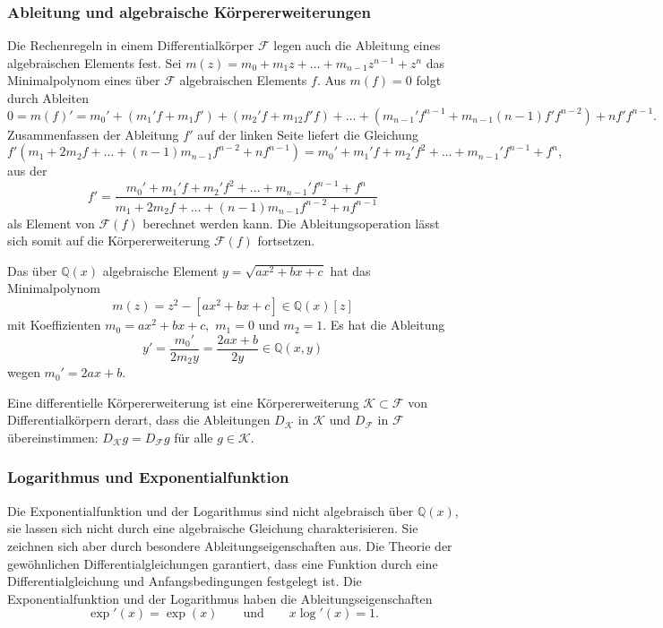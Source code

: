 \subsubsection{Ableitung und algebraische Körpererweiterungen}
Die Rechenregeln in einem Differentialkörper $\mathscr{F}$ legen auch die
Ableitung eines algebraischen Elements fest.
Sei $m(z)=m_0+m_1z+\ldots+m_{n-1}z^{n-1}+z^n$ das Minimalpolynom eines
über $\mathscr{F}$ algebraischen Elements $f$.
Aus $m(f)=0$ folgt durch Ableiten
\[
0
=
m(f)'
=
m_0'
+
(m_1'f+m_1f')
+
(m_2'f + m_12f'f)
+
\ldots
+
(m_{n-1}'f^{n-1} + m_{n-1} (n-1)f'f^{n-2})
+
nf'f^{n-1}.
\]
Zusammenfassen der Ableitung $f'$ auf der linken Seite liefert die
Gleichung
\[
f'(
m_1+2m_2f+\ldots+(n-1)m_{n-1}f^{n-2}+nf^{n-1}
)
=
m_0' + m_1'f + m_2'f^2 + \ldots + m_{n-1}'f^{n-1} + f^n,
\]
aus der
\[
f'
=
\frac{
m_0' + m_1'f + m_2'f^2 + \ldots + m_{n-1}'f^{n-1} + f^n
}{
m_1+2m_2f+\ldots+(n-1)m_{n-1}f^{n-2}+nf^{n-1}
}
\]
als Element von $\mathscr{F}(f)$ berechnet werden kann.
Die Ableitungsoperation lässt sich somit auf die Körpererweiterung
$\mathscr{F}(f)$ fortsetzen.

\begin{beispiel}
Das über $\mathbb{Q}(x)$ algebraische Element $y=\sqrt{ax^2+bx+c}$
hat das Minimalpolynom
\[
m(z)
=
z^2 - [ax^2+bx+c]
\in
\mathbb{Q}(x)[z]
\]
mit Koeffizienten $m_0 = ax^2+bx+c,$ $m_1=0$ und $m_2=1$.
Es hat die Ableitung
\[
y'
= 
\frac{m_0'}{2m_2y}
=
\frac{
2ax+b
}{
2y
}
\in
\mathbb{Q}(x,y)
\]
wegen $m_0'=2ax+b$.
\end{beispiel}

\begin{definition}
Eine differentielle Körpererweiterung ist eine Körpererweiterung
$\mathscr{K}\subset\mathscr{F}$ von Differentialkörpern derart, dass
die Ableitungen $D_{\mathscr{K}}$ in $\mathscr{K}$
und $D_{\mathscr{F}}$ in $\mathscr{F}$ übereinstimmen:
\(
D_{\mathscr{K}}g= D_{\mathscr{F}} g
\)
für alle $g\in\mathscr{K}$.
\end{definition}

%
%
\subsubsection{Logarithmus und Exponentialfunktion}
Die Exponentialfunktion und der Logarithmus sind nicht algebraisch
über $\mathbb{Q}(x)$, sie lassen sich nicht durch eine algebraische
Gleichung charakterisieren.
Sie zeichnen sich aber durch besondere Ableitungseigenschaften aus.
Die Theorie der gewöhnlichen Differentialgleichungen garantiert,
dass eine Funktion durch eine Differentialgleichung und Anfangsbedingungen
festgelegt ist.
\label{buch:integral:expundlog}
Die Exponentialfunktion und der Logarithmus haben die 
Ableitungseigenschaften
%
%
\[
\exp'(x) = \exp(x)
\qquad\text{und}\qquad
x \log'(x) = 1.
\]

